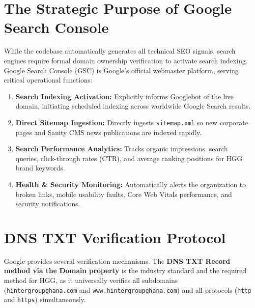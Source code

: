 \documentclass[11pt,a4paper,oneside]{book}
\begin{document}
\section{The Strategic Purpose of Google Search Console}
While the codebase automatically generates all technical SEO signals, search engines require formal domain ownership verification to activate search indexing. Google Search Console (GSC) is Google's official webmaster platform, serving critical operational functions:
\begin{enumerate}[leftmargin=1.2cm]
  \item \textbf{Search Indexing Activation:} Explicitly informs Googlebot of the live domain, initiating scheduled indexing across worldwide Google Search results.
  \item \textbf{Direct Sitemap Ingestion:} Directly ingests \texttt{sitemap.xml} so new corporate pages and Sanity CMS news publications are indexed rapidly.
  \item \textbf{Search Performance Analytics:} Tracks organic impressions, search queries, click-through rates (CTR), and average ranking positions for HGG brand keywords.
  \item \textbf{Health \& Security Monitoring:} Automatically alerts the organization to broken links, mobile usability faults, Core Web Vitals performance, and security notifications.
\end{enumerate}

\section{DNS TXT Verification Protocol}
Google provides several verification mechanisms. The \textbf{DNS TXT Record method via the Domain property} is the industry standard and the required method for HGG, as it universally verifies all subdomains (\texttt{hintergroupghana.com} and \texttt{www.hintergroupghana.com}) and all protocols (\texttt{http} and \texttt{https}) simultaneously.
\end{document}
